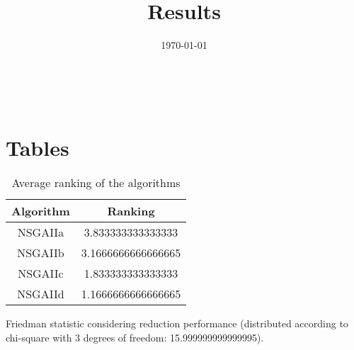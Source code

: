 \documentclass{article}
\title{Results}
\author{}
\date{\today}
\begin{document}
\oddsidemargin 0in \topmargin 0in\maketitle
\
\section{Tables}
\begin{table}[!htp]
\centering
\caption{Average ranking of the algorithms}
\begin{tabular}{c|c}
Algorithm&Ranking\\
\hline
NSGAIIa&3.833333333333333\\
NSGAIIb&3.1666666666666665\\
NSGAIIc&1.833333333333333\\
NSGAIId&1.1666666666666665\\
\end{tabular}
\end{table}


Friedman statistic considering reduction performance (distributed according to chi-square with 3 degrees of freedom: 15.999999999999995).
\end{document}
